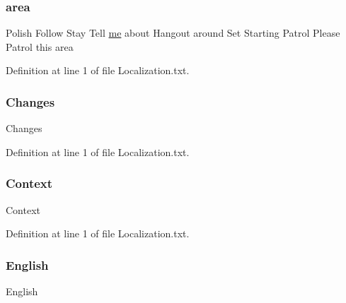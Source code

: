 \subsubsection{\texorpdfstring{area}{area}}
{\footnotesize\ttfamily Polish Follow Stay Tell \mbox{\hyperlink{_blooms_01_animal_01_husbandry_2_config_2_localization_8txt_a290fbecf7c016b09bc675718400d6fca}{me}} about Hangout around Set Starting Patrol Please Patrol this area}



Definition at line 1 of file Localization.\+txt.

\mbox{\label{_blooms_01_animal_01_husbandry_2_config_2_localization_8txt_aada75e543d2eadaa69533d17cac8bd9a}} 
\subsubsection{\texorpdfstring{Changes}{Changes}}
{\footnotesize\ttfamily Changes}



Definition at line 1 of file Localization.\+txt.

\mbox{\label{_blooms_01_animal_01_husbandry_2_config_2_localization_8txt_abbebfae2c8b3c06e3115e79965277840}} 
\subsubsection{\texorpdfstring{Context}{Context}}
{\footnotesize\ttfamily Context}



Definition at line 1 of file Localization.\+txt.

\mbox{\label{_blooms_01_animal_01_husbandry_2_config_2_localization_8txt_ad896b63205779b1b09e86d941ce13976}} 
\subsubsection{\texorpdfstring{English}{English}}
{\footnotesize\ttfamily English}



